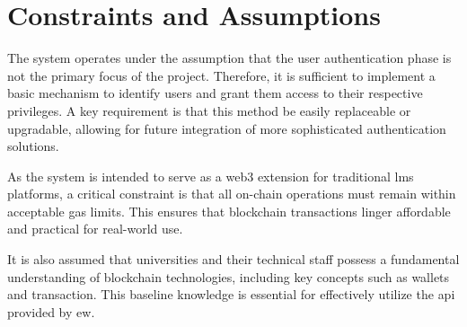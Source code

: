 \section{Constraints and Assumptions}
The system operates under the assumption that the user authentication phase is not the primary focus of the project. Therefore, it is sufficient to implement a basic mechanism to identify users and grant them access to their respective privileges. A key requirement is that this method be easily replaceable or upgradable, allowing for future integration of more sophisticated authentication solutions.

As the system is intended to serve as a \Gls{web3} extension for traditional \acrshort{lms} platforms, a critical constraint is that all on-chain operations must remain within acceptable gas limits. This ensures that blockchain transactions linger affordable and practical for real-world use.

It is also assumed that universities and their technical staff possess a fundamental understanding of blockchain technologies, including key concepts such as wallets and transaction. This baseline knowledge is essential for effectively utilize the \acrshort{api} provided by \acrshort{ew}.